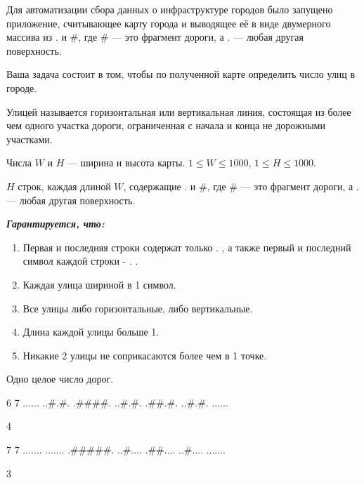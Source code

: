 
Для автоматизации сбора данных о инфраструктуре городов было запущено приложение, считывающее карту города и выводящее её в виде двумерного массива из . и \#, где \# — это фрагмент дороги, а . — любая другая поверхность.

Ваша задача состоит в том, чтобы по полученной карте определить число улиц в городе.

Улицей называется горизонтальная или вертикальная линия, состоящая из более чем одного участка дороги, ограниченная с начала и конца не дорожными участками.


Числа $W$ и $H$ — ширина и высота карты. $1\leq W\leq 1000$, $1\leq H\leq 1000$.

$H$ строк, каждая длиной $W$, содержащие . и \#, где \# — это фрагмент дороги, а . — любая другая поверхность.

\textbf{\textit{Гарантируется, что:}}

\begin{enumerate}
    \item Первая и последняя строки содержат только . , а также первый и последний символ каждой строки - . .
    \item Каждая улица шириной в 1 символ.
    \item Все улицы либо горизонтальные, либо вертикальные.
    \item Длина каждой улицы больше 1.
    \item Никакие 2 улицы не соприкасаются более чем в 1 точке.
\end{enumerate}

\outputfmtSection

Одно целое число дорог.


\begin{myverbbox}[\small]{\vinput}
    6 7
    ......
    ..#.#.
    .####.
    ..#.#.
    .##.#.
    ..#.#.
    ......
\end{myverbbox}
\begin{myverbbox}[\small]{\voutput}
    4
\end{myverbbox}


\begin{myverbbox}[\small]{\vinput}
    7 7
    .......
    .......
    .#####.
    ..#....
    .##....
    ..#....
    .......
\end{myverbbox}
\begin{myverbbox}[\small]{\voutput}
    3
\end{myverbbox}

